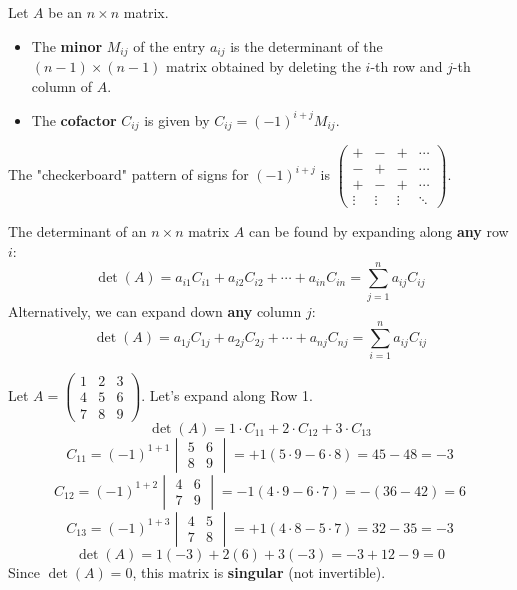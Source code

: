 \begin{definition}
Let $A$ be an $n \times n$ matrix.
\begin{itemize}
    \item The \textbf{minor} $M_{ij}$ of the entry $a_{ij}$ is the determinant of the $(n-1) \times (n-1)$ matrix obtained by deleting the $i$-th row and $j$-th column of $A$.
    \item The \textbf{cofactor} $C_{ij}$ is given by $C_{ij} = (-1)^{i+j} M_{ij}$.
\end{itemize}
\end{definition}

The "checkerboard" pattern of signs for $(-1)^{i+j}$ is $\begin{pmatrix} + & - & + & \cdots \\ - & + & - & \cdots \\ + & - & + & \cdots \\ \vdots & \vdots & \vdots & \ddots \end{pmatrix}$.

\begin{theorem}
The determinant of an $n \times n$ matrix $A$ can be found by expanding along \textbf{any} row $i$:
\[ \det(A) = a_{i1}C_{i1} + a_{i2}C_{i2} + \cdots + a_{in}C_{in} = \sum_{j=1}^{n} a_{ij}C_{ij} \]
Alternatively, we can expand down \textbf{any} column $j$:
\[ \det(A) = a_{1j}C_{1j} + a_{2j}C_{2j} + \cdots + a_{nj}C_{nj} = \sum_{i=1}^{n} a_{ij}C_{ij} \]
\end{theorem}

\begin{example}
Let $A = \begin{pmatrix} 1 & 2 & 3 \\ 4 & 5 & 6 \\ 7 & 8 & 9 \end{pmatrix}$. Let's expand along Row 1.
\[ \det(A) = 1 \cdot C_{11} + 2 \cdot C_{12} + 3 \cdot C_{13} \]
\[ C_{11} = (-1)^{1+1} \begin{vmatrix} 5 & 6 \\ 8 & 9 \end{vmatrix} = +1(5\cdot 9 - 6\cdot 8) = 45 - 48 = -3 \]
\[ C_{12} = (-1)^{1+2} \begin{vmatrix} 4 & 6 \\ 7 & 9 \end{vmatrix} = -1(4\cdot 9 - 6\cdot 7) = -(36 - 42) = 6 \]
\[ C_{13} = (-1)^{1+3} \begin{vmatrix} 4 & 5 \\ 7 & 8 \end{vmatrix} = +1(4\cdot 8 - 5\cdot 7) = 32 - 35 = -3 \]
\[ \det(A) = 1(-3) + 2(6) + 3(-3) = -3 + 12 - 9 = 0 \]
Since $\det(A) = 0$, this matrix is \textbf{singular} (not invertible).
\end{example}

